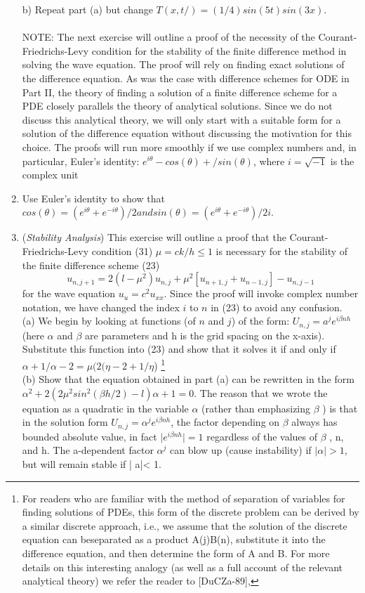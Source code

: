 \documentclass[../main.tex]{subfiles}
\begin{document}
\begin{enumerate}
b) Repeat part (a) but change $T(x,t/) = (1/ 4)sin(5t)sin(3x)$. 
\\
\\
NOTE: The next exercise will outline a proof of the necessity of the Courant-Friedrichs-Levy 
condition for the stability of the finite difference method in solving the wave equation. The proof will 
rely on finding exact solutions of the difference equation. As was the case with difference schemes for 
ODE in Part II, the theory of finding a solution of a finite difference scheme for a PDE closely parallels 
the theory of analytical solutions. Since we do not discuss this analytical theory, we will only start with 
a suitable form for a solution of the difference equation without discussing the motivation for this 
choice. The proofs will run more smoothly if we use complex numbers and, in particular, Euler's 
identity: $e^{i\theta} - cos(\theta) + /sin(\theta)$, where $i = \sqrt{-1}$ is the complex unit
	\item
		Use Euler's identity to show that $cos(\theta) = (e^{i\theta}+ e^{-i\theta})/2 and sin(\theta) = (e^{i\theta}+ e^{-i\theta})/2i$. 
		\item
			(\textit{Stability Analysis}) This exercise will outline a proof that the Courant-Friedrichs-Levy 
condition (31) $\mu = ck / h \leqslant 1$ is necessary for the stability of the finite difference scheme (23)
$$u_{n,j+1}=2(l-\mu^2)u_{n,j}+\mu^2[u_{n+1,j}+u_{n-1,j}]-u_{n,j-1}$$
for the wave equation $u_u = c^2u_{xx}$. Since the proof will invoke complex number notation, we have changed the index $i$ to $n$ in (23) to avoid any confusion.
\\ 
(a) We begin by looking at functions (of $n$ and $j$) of the form: $U_{n,j} = a^je^{i\beta n h}$ (here $\alpha$ and $\beta$ are parameters and h is the grid spacing on the x-axis). Substitute this function into (23) and show that it solves it if and only if $\alpha +1 /\alpha-2 = \mu(2(\eta-2 + 1/\eta$) 
\footnote{For readers who are familiar with the method of separation of variables for finding solutions of PDEs, this form of the discrete problem can be derived by a similar discrete approach, i.e., we assume that the solution of the discrete equation can beseparated as a product A(j)B(n), substitute it into the difference equation, and then determine the form of A and B. For more details on this interesting analogy (as well as a full account of the relevant analytical theory) we refer the reader to [DuCZa-89], }
\\(b) Show that the equation obtained in part (a) can be rewritten in the form $\alpha^2 +2(2\mu^2 sin^2(\beta h/2)- l)\alpha + 1 = 0$. The reason that we wrote the equation as a quadratic in the variable $\alpha$ (rather than emphasizing $\beta$ ) is that in the solution form $U_{n,j} = \alpha^j e^{i\beta n h}$, the factor depending on $\beta$ always has bounded absolute value, in fact $\vert e^{i\beta n h} \vert=1$ regardless of the values of $\beta$ , n, and h. The a-dependent factor $\alpha^j$ can blow up (cause instability) if $\vert\alpha \vert > 1$, but will remain stable if | a|< 1.

\end{enumerate}
\end{document}
